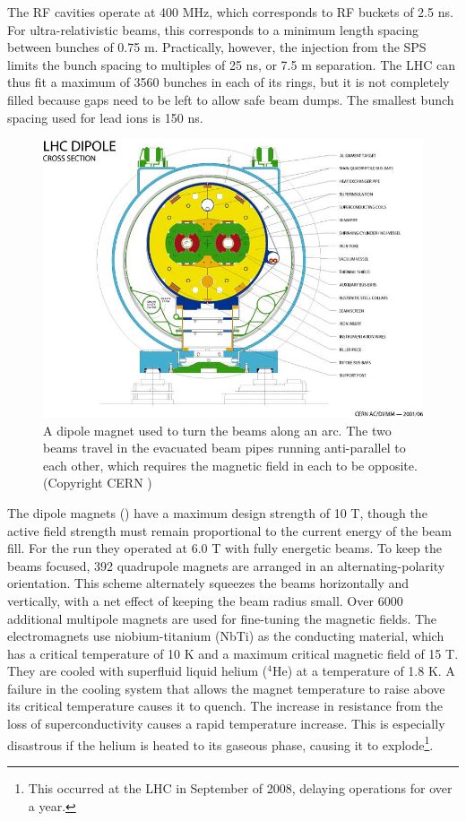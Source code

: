 The RF cavities operate at 400 MHz, which corresponds to RF buckets of 2.5 ns.
For ultra-relativistic beams, this corresponds to a minimum length spacing between bunches of 0.75 m.
Practically, however, the injection from the SPS limits the bunch spacing to multiples of 25 ns, or 7.5 m separation.
The LHC can thus fit a maximum of 3560 bunches in each of its rings, but it is not completely filled because gaps need to be left to allow safe beam dumps.
The smallest bunch spacing used for lead ions is 150 ns.

\begin{figure}[t]
\includegraphics[width=0.8\linewidth]{LHC-PHO-2001-187.jpg}
\caption{A dipole magnet used to turn the beams along an arc. The two beams travel in the evacuated beam pipes running anti-parallel to each other, which requires the magnetic field in each to be opposite. (Copyright CERN \cite{Valeriane:843195})}
\label{fig:dipole_cross_section}
\end{figure}

The dipole magnets (\Fig{\ref{fig:dipole_cross_section}}) have a maximum design strength of 10 T, though the active field strength must remain proportional to the current energy of the beam fill.
For the \pPbenergy \pPb run they operated at 6.0 T with fully energetic beams.
To keep the beams focused, 392 quadrupole magnets are arranged in an alternating-polarity orientation.
This scheme alternately squeezes the beams horizontally and vertically, with a net effect of keeping the beam radius small.
Over 6000 additional multipole magnets are used for fine-tuning the magnetic fields.
The electromagnets use niobium-titanium (NbTi) as the conducting material, which has a critical temperature of 10 K and a maximum critical magnetic field of 15 T.
They are cooled with superfluid liquid helium (${}^{4}\textrm{He}$) at a temperature of 1.8 K.
A failure in the cooling system that allows the magnet temperature to raise above its critical temperature causes it to quench.
The increase in resistance from the loss of superconductivity causes a rapid temperature increase.
This is especially disastrous if the helium is heated to its gaseous phase, causing it to explode\footnote{This occurred at the LHC in September of 2008, delaying operations for over a year.}.


